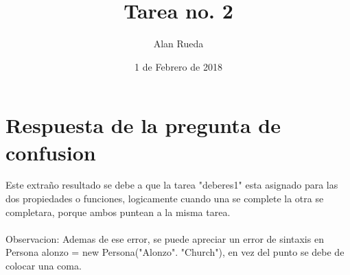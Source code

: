 \documentclass[8pt, a4paper]{article} %
\author{Alan Rueda} %
\date{1 de Febrero de 2018} %
\begin{document}
  \title{Tarea no. 2} %
   \maketitle %
  
    \section{Respuesta de la pregunta de confusion} %
    \begin{sloppypar} %
    Este extraño resultado se debe a que la tarea "deberes1" esta asignado para las dos propiedades o funciones, logicamente cuando una se complete la otra se completara, porque ambos puntean a la misma tarea.\\
    \\
    Observacion: Ademas de ese error, se puede apreciar un error de sintaxis en Persona alonzo = new Persona("Alonzo". "Church"), en vez del punto se debe de colocar una coma.\\
    \end{sloppypar}  
    
        
\end{document}
